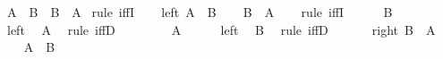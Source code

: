 %
\begin{isabellebody}%
%
%
\isadelimtheory
%
\endisadelimtheory
%
\isatagtheory
%
\endisatagtheory
{\isafoldtheory}%
%
\isadelimtheory
%
\endisadelimtheory
%
\isamarkuptrue%
%
\begin{isamarkuptext}%
\begin{Answer}[ref = biconditional] \end{Answer}%
\end{isamarkuptext}\isamarkuptrue%
\isamarkupfalse%
\ {\isachardoublequoteopen}{\isacharparenleft}A\ {\isasymlongleftrightarrow}\ B{\isacharparenright}\ {\isasymlongleftrightarrow}\ {\isacharparenleft}B\ {\isasymlongleftrightarrow}\ A{\isacharparenright}{\isachardoublequoteclose}\isanewline
%
\isadelimproof
%
\endisadelimproof
%
\isatagproof
{}\isamarkupfalse%
\ {\isacharparenleft}rule\ iffI{\isacharparenright}\isanewline
\ \ \isamarkupfalse%
\ left{\isacharcolon}\ {\isachardoublequoteopen}A\ {\isasymlongleftrightarrow}\ B{\isachardoublequoteclose}\isanewline
\ \ \isamarkupfalse%
\ {\isachardoublequoteopen}B\ {\isasymlongleftrightarrow}\ A{\isachardoublequoteclose}\isanewline
\ \ \isamarkupfalse%
\ {\isacharparenleft}rule\ iffI{\isacharparenright}\isanewline
\ \ \ \ \isamarkupfalse%
\ {\isachardoublequoteopen}B{\isachardoublequoteclose}\isanewline
\ \ \ \ \isamarkupfalse%
\ left\ \isamarkupfalse%
\ {\isachardoublequoteopen}A{\isachardoublequoteclose}\ \isamarkupfalse%
\ {\isacharparenleft}rule\ iffD{}{\isacharparenright}\isanewline
\ \ \isamarkupfalse%
\isanewline
\ \ \ \ \isamarkupfalse%
\ {\isachardoublequoteopen}A{\isachardoublequoteclose}\isanewline
\ \ \ \ \isamarkupfalse%
\ left\ \isamarkupfalse%
\ {\isachardoublequoteopen}B{\isachardoublequoteclose}\ \isamarkupfalse%
\ {\isacharparenleft}rule\ iffD{}{\isacharparenright}\isanewline
\ \ \isamarkupfalse%
\isanewline
{}\isamarkupfalse%
\isanewline
\ \ \isamarkupfalse%
\ right{\isacharcolon}\ {\isachardoublequoteopen}B\ {\isasymlongleftrightarrow}\ A{\isachardoublequoteclose}\isanewline
\ \ \isamarkupfalse%
\ {\isachardoublequoteopen}A\ {\isasymlongleftrightarrow}\ B{\isachardoublequoteclose}\isanewline
\ \ \isamarkupfalse%
\isanewline
\ \ \ \ \isamarkupfalse%

\end{isabellebody}
